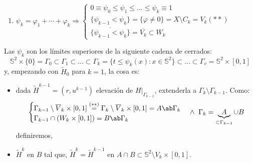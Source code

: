 \begin{demo}
\begin{enumerate}
\begin{enumerate}
        \item $\psi_k = \varphi_1 + \cdots + \varphi_k \Rightarrow \begin{cases}
            0 \equiv \psi_0 \le \psi_1 \le \ldots \le \psi_k \equiv 1\\
            \{\psi_{k - 1} < \psi_k\} = \{\varphi \neq 0\} = X \setminus C_k = V_k (**)\\
            \overline{\{\psi_{k - 1} < \psi_k\}} = \overline{V_k} \subset W_k
        \end{cases}$
    \end{enumerate}
    Las $\psi_k$ son los límites superiores de la siguiente cadena de cerrados:
    \[
    \mathbb{S}^{2} \times \{0\} = \Gamma_0 \subset \Gamma_1 \subset \ldots \subset \Gamma_k = \{t \le \psi_k\left( x \right) : x \in \mathbb{S}^{2}\} \subset  \ldots \subset \Gamma_v = \mathbb{S}^{2} \times \left[ 0, 1 \right] 
    \]
    y, empezando con $\tilde{H}_0$ para $k = 1$, la cosa es:
    \begin{itemize}
        \item dada $\tilde{H}^{k - 1} = \left( r, u^{k - 1} \right)$ elevación de $H|_{\Gamma_{k - 1}}$, extenderla a $\Gamma_k \setminus \Gamma_{k - 1}$. Como:
        \[
        \begin{cases}
            \Gamma_{k - 1} \setminus \overline{V}_k \times \left[ 0, 1 \right] \stackrel{(**)}{=} \Gamma_k \setminus \overline{V}_k \times \left[ 0, 1 \right] = A \ab \Gamma_k\\
            \Gamma_{k - 1} \cap \left( W_k \times \left[ 0, 1 \right] \right) = B \ab \Gamma_k
        \end{cases}\land\ \Gamma_k = \underbrace{A}_{\subset \Gamma_{k - 1}} \cup B
        \]
        definiremos,
        \item $\tilde{H}^k$ en $B$ tal que, $\tilde{H}^k = \tilde{H}^{k - 1}$ en $A \cap B \subset \mathbb{S}^{2} \setminus V_k \times \left[ 0, 1 \right]$.
    \end{itemize}


\end{enumerate}
\end{demo}

